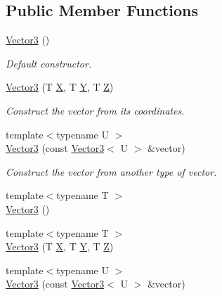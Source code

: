 \subsection*{Public Member Functions}
\begin{DoxyCompactItemize}
\item 
\hyperlink{classsf_1_1_vector3_aee8be1985c6e45e381ad4071265636f9}{Vector3} ()
\begin{DoxyCompactList}\small\item\em Default constructor. \end{DoxyCompactList}\item 
\hyperlink{classsf_1_1_vector3_a99ed75b68f58adfa3e9fa0561b424bf6}{Vector3} (T \hyperlink{glsmapint_8h_adf764cbdea00d65edcd07bb9953ad2b7a58833a3110c570fb05130d40c365d1e4}{X}, T \hyperlink{glsmapint_8h_adf764cbdea00d65edcd07bb9953ad2b7a5596231eabd6cf29050967d5ac83ad84}{Y}, T \hyperlink{glsmapint_8h_adf764cbdea00d65edcd07bb9953ad2b7aa70478ce277ffc322f8e1e3418e07355}{Z})
\begin{DoxyCompactList}\small\item\em Construct the vector from its coordinates. \end{DoxyCompactList}\item 
{\footnotesize template$<$typename U $>$ }\\\hyperlink{classsf_1_1_vector3_adb2b2e150025e97ccfa96219bbed59d1}{Vector3} (const \hyperlink{classsf_1_1_vector3}{Vector3}$<$ U $>$ \&vector)
\begin{DoxyCompactList}\small\item\em Construct the vector from another type of vector. \end{DoxyCompactList}\item 
{\footnotesize template$<$typename T $>$ }\\\hyperlink{classsf_1_1_vector3_a49536881e57dd6f1bec692bb85b39413}{Vector3} ()
\item 
{\footnotesize template$<$typename T $>$ }\\\hyperlink{classsf_1_1_vector3_a6d71676baa113af029006c01620fd4ca}{Vector3} (T \hyperlink{glsmapint_8h_adf764cbdea00d65edcd07bb9953ad2b7a58833a3110c570fb05130d40c365d1e4}{X}, T \hyperlink{glsmapint_8h_adf764cbdea00d65edcd07bb9953ad2b7a5596231eabd6cf29050967d5ac83ad84}{Y}, T \hyperlink{glsmapint_8h_adf764cbdea00d65edcd07bb9953ad2b7aa70478ce277ffc322f8e1e3418e07355}{Z})
\item 
{\footnotesize template$<$typename U $>$ }\\\hyperlink{classsf_1_1_vector3_adb2b2e150025e97ccfa96219bbed59d1}{Vector3} (const \hyperlink{classsf_1_1_vector3}{Vector3}$<$ U $>$ \&vector)
\end{DoxyCompactItemize}

